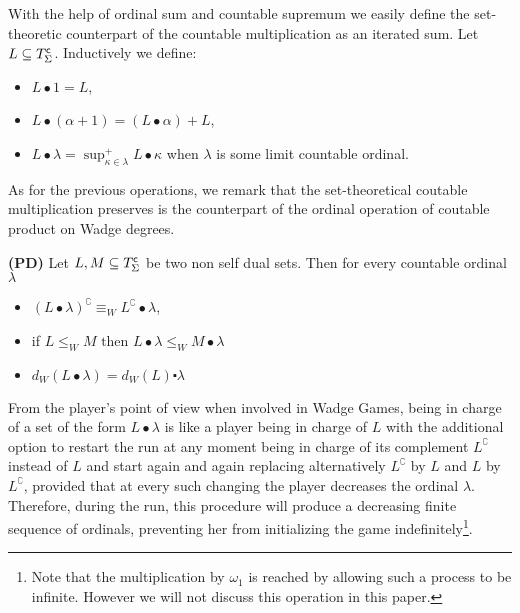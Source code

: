 \documentclass{llncs}
\begin{document}
\vspace{0.2cm}
 \hspace{0.1cm}
With the help of ordinal sum and countable supremum we easily define the set-theoretic counterpart of the countable multiplication as an iterated sum. 
Let $L \subseteq  T^{\sf c}_{\Sigma} $.  Inductively we define: 
\begin{itemize}
\item $L \bullet 1 = L$, 
\item $L \bullet (\alpha + 1) = (L \bullet \alpha)+L$, 
\item $L \bullet \lambda = \sup^+_{\kappa \in \lambda} L \bullet \kappa$ when $\lambda$  is some limit countable ordinal.
\end{itemize}

As for the previous operations, we remark that   the set-theoretical coutable multiplication preserves is the counterpart of the ordinal operation of coutable product  on Wadge degrees.

\begin{remark}{\bf (PD)}
\label{r_mult}
Let $L, M\subseteq T^{\sf c}_\Sigma$ be two non self dual sets. Then for every countable ordinal $\lambda$
\begin{itemize}
\item $(L\bullet \lambda)^\complement \equiv_W L^\complement \bullet \lambda$,
\item if $L \leq_W M\text{ then } L\bullet \lambda \leq_W M\bullet \lambda$
\item $d_W(L \bullet \lambda)= d_W(L) \centerdot \lambda$
\end{itemize}
\end{remark}


From the player's point of view when involved in Wadge Games, being in charge of a set of the form $L\bullet \lambda$ is like a player being in charge of $L$ with the additional option to restart the run at any moment being 
in charge of its complement $L^\complement$ instead of $L$ and start again and again replacing alternatively $L^\complement$ by $L$ and  $L$ by 
$L^\complement$,  provided that at every such changing the player decreases the ordinal $\lambda$.  Therefore, during the run, this procedure will produce a decreasing finite sequence of ordinals, preventing her from initializing the game indefinitely\footnote{ 
Note that the multiplication by $\omega_1$ is reached  by allowing such a process to be infinite. However we will not discuss this operation in this paper.}.
\end{document}
